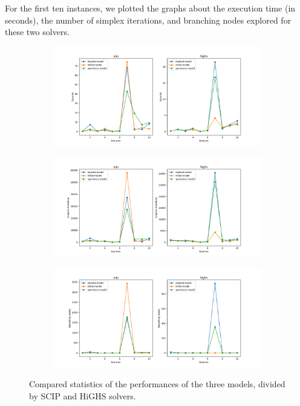 For the first ten instances, we plotted the graphs about the execution time (in seconds), the number of simplex iterations, and branching nodes explored for these two solvers.
\begin{figure}[H]
    \centering
    \begin{subfigure}{0.8\linewidth}
        \includegraphics[width=\textwidth]{img/mip/execution_time_2.png}
    \end{subfigure}
    \begin{subfigure}{0.8\linewidth}
        \includegraphics[width=\textwidth]{img/mip/simplex_iterations_2.png}
    \end{subfigure}
    \begin{subfigure}{0.8\linewidth}
        \includegraphics[width=\textwidth]{img/mip/Figure_2.png}
    \end{subfigure}
    \caption{Compared statistics of the performances of the three models, divided by SCIP and HiGHS solvers.}
\end{figure}

